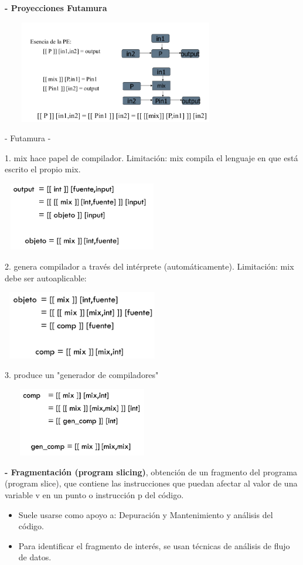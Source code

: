 \documentclass[12pt]{amsart}
\begin{document}
    \textbf{- Proyecciones Futamura}
    \begin{center}
        \includegraphics[width=10cm, height=4.5cm]{t2futamura.png}
        
        - Futamura -

         1. mix hace papel de compilador. Limitación: mix compila
        el lenguaje en que está escrito el propio mix.

        \includegraphics[width=7cm, height=3cm]{t2futamura1.png}

         2. genera compilador a través del intérprete 
         (automáticamente). Limitación: mix debe ser autoaplicable:

         \includegraphics[width=7cm, height=3cm]{t2futamura2.png}

         3. produce un "generador de compiladores"

         \includegraphics[width=7cm, height=3cm]{t2futamura3.png}
    \end{center}

    \textbf{- Fragmentación (program slicing)}, obtención de
    un fragmento del programa (program slice), que contiene
    las instrucciones que puedan afectar al valor de una variable
    v en un punto o instrucción p del código.
    \begin{itemize}
        \item Suele usarse como apoyo a: Depuración y Mantenimiento y 
        análisis del código.
        \item Para identificar el fragmento de interés, se usan
        técnicas de análisis de flujo de datos.
    \end{itemize}
\end{document}
